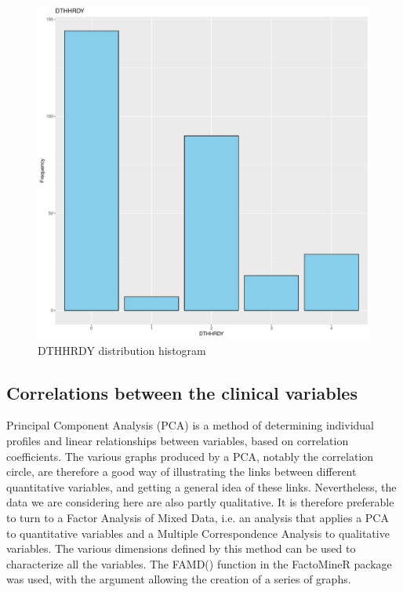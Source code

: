 \documentclass[a4paper, 11pt]{article}
\begin{document}
\begin{multicols}{2}
\begin{figure}[H]
	\centering
	\includegraphics[width=\columnwidth]{figures/clinical_data_var_dist/DTHHRDY}
	\caption{DTHHRDY distribution histogram }
	\label{fig:corCircle}
\end{figure}

\subsection{Correlations between the clinical variables}

Principal Component Analysis (PCA) is a method of determining individual profiles and linear relationships between variables, based on correlation coefficients. The various graphs produced by a PCA, notably the correlation circle, are therefore a good way of illustrating the links between different quantitative variables, and getting a general idea of these links. Nevertheless, the data we are considering here are also partly qualitative. It is therefore preferable to turn to a Factor Analysis of Mixed Data, i.e. an analysis that applies a PCA to quantitative variables and a Multiple Correspondence Analysis to qualitative variables. The various dimensions defined by this method can be used to characterize all the variables. The FAMD() function in the FactoMineR package was used, with the argument allowing the creation of a series of graphs.


\end{multicols}
\end{document}
